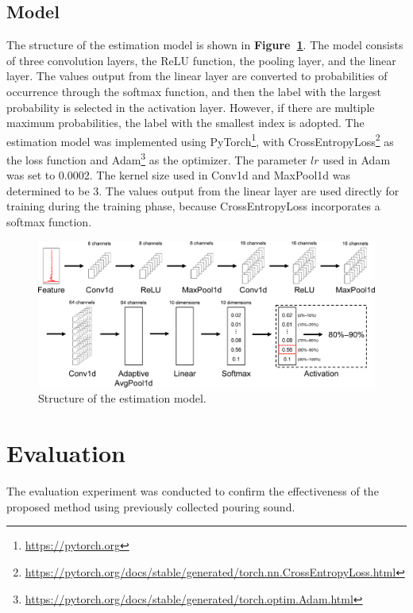\documentclass[sigconf]{acmart}
\newcommand\figref[1]{\textbf{Figure~\ref{fig:#1}}}
\begin{document}
\subsection{Model}
The structure of the estimation model is shown in \figref{model}. The model consists of three convolution layers, the ReLU function, the pooling layer, and the linear layer. The values output from the linear layer are converted to probabilities of occurrence through the softmax function, and then the label with the largest probability is selected in the activation layer. However, if there are multiple maximum probabilities, the label with the smallest index is adopted. The estimation model was implemented using PyTorch\footnote{\url{https://pytorch.org}}, with CrossEntropyLoss\footnote{\url{https://pytorch.org/docs/stable/generated/torch.nn.CrossEntropyLoss.html}} as the loss function and Adam\footnote{\url{https://pytorch.org/docs/stable/generated/torch.optim.Adam.html}} as the optimizer. The parameter $lr$ used in Adam was set to 0.0002. The kernel size used in Conv1d and MaxPool1d was determined to be 3. The values output from the linear layer are used directly for training during the training phase, because CrossEntropyLoss incorporates a softmax function.

\begin{figure}[!t]
  \centering
  \includegraphics[width=0.8\linewidth]{figures/model.eps}
  \caption{Structure of the estimation model.}
  \label{fig:model}
\end{figure}



\section{Evaluation}
\label{sec:evaluation}
The evaluation experiment was conducted to confirm the effectiveness of the proposed method using previously collected pouring sound.

\end{document}
